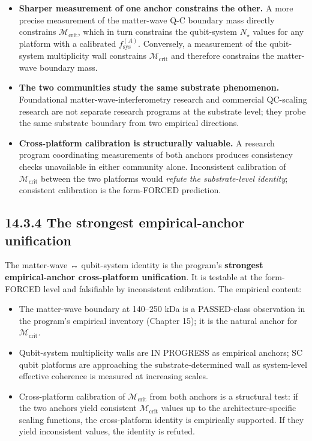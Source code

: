 \documentclass[11pt]{book}
\begin{document}
\begin{itemize}
\item \textbf{Sharper measurement of one anchor constrains the other.} A more precise measurement of the matter-wave Q-C boundary mass directly constrains $\mathcal{M}_\mathrm{crit}$, which in turn constrains the qubit-system $N_\star$ values for any platform with a calibrated $f_\mathrm{sys}^{(A)}$. Conversely, a measurement of the qubit-system multiplicity wall constrains $\mathcal{M}_\mathrm{crit}$ and therefore constrains the matter-wave boundary mass.
\item \textbf{The two communities study the same substrate phenomenon.} Foundational matter-wave-interferometry research and commercial QC-scaling research are not separate research programs at the substrate level; they probe the same substrate boundary from two empirical directions.
\item \textbf{Cross-platform calibration is structurally valuable.} A research program coordinating measurements of both anchors produces consistency checks unavailable in either community alone. Inconsistent calibration of $\mathcal{M}_\mathrm{crit}$ between the two platforms would \textit{refute the substrate-level identity}; consistent calibration is the form-FORCED prediction.
\end{itemize}

\subsection{14.3.4 The strongest empirical-anchor unification}

The matter-wave ↔ qubit-system identity is the program's \textbf{strongest empirical-anchor cross-platform unification}. It is testable at the form-FORCED level and falsifiable by inconsistent calibration. The empirical content:

\begin{itemize}
\item The matter-wave boundary at 140–250 kDa is a PASSED-class observation in the program's empirical inventory (Chapter 15); it is the natural anchor for $\mathcal{M}_\mathrm{crit}$.
\item Qubit-system multiplicity walls are IN PROGRESS as empirical anchors; SC qubit platforms are approaching the substrate-determined wall as system-level effective coherence is measured at increasing scales.
\item Cross-platform calibration of $\mathcal{M}_\mathrm{crit}$ from both anchors is a structural test: if the two anchors yield consistent $\mathcal{M}_\mathrm{crit}$ values up to the architecture-specific scaling functions, the cross-platform identity is empirically supported. If they yield inconsistent values, the identity is refuted.
\end{itemize}
\end{document}
